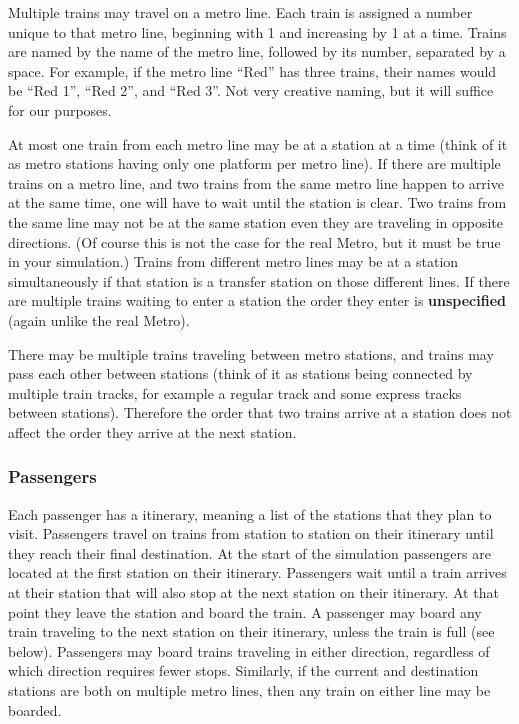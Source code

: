 \documentclass[11pt]{article}
\begin{document}
        Multiple trains may travel on a metro line.  Each train is assigned a
      number unique to that metro line, beginning with 1 and increasing by 1
      at a time.  Trains are named by the name of the metro line, followed
      by its number, separated by a space. For example, if the metro line
      ``Red'' has three trains, their names would be ``Red 1'', ``Red 2'',
      and ``Red 3''.  Not very creative naming, but it will suffice for our
      purposes.

        At most one train from each metro line may be at a station at a time
      (think of it as metro stations having only one platform per metro
      line).  If there are multiple trains on a metro line, and two trains
      from the same metro line happen to arrive at the same time, one will
      have to wait until the station is clear.  Two trains from the same
      line may not be at the same station even they are traveling in
      opposite directions.  (Of course this is not the case for the real
      Metro, but it must be true in your simulation.)  Trains from different
      metro lines may be at a station simultaneously if that station is a
      transfer station on those different lines.  If there are multiple
      trains waiting to enter a station the order they enter is
      \textbf{unspecified} (again unlike the real Metro).

        There may be multiple trains traveling between metro stations, and
      trains may pass each other between stations (think of it as stations
      being connected by multiple train tracks, for example a regular track
      and some express tracks between stations).  Therefore the order that
      two trains arrive at a station does not affect the order they arrive
      at the next station.

      \subsubsection{Passengers}

        Each passenger has a itinerary, meaning a list of the stations that
      they plan to visit.  Passengers travel on trains from station to
      station on their itinerary until they reach their final destination.
      At the start of the simulation passengers are located at the first
      station on their itinerary.  Passengers wait until a train arrives at
      their station that will also stop at the next station on their
      itinerary.  At that point they leave the station and board the train.
      A passenger may board any train traveling to the next station on their
      itinerary, unless the train is full (see below).  Passengers may board
      trains traveling in either direction, regardless of which direction
      requires fewer stops.  Similarly, if the current and destination
      stations are both on multiple metro lines, then any train on either
      line may be boarded.
\end{document}

